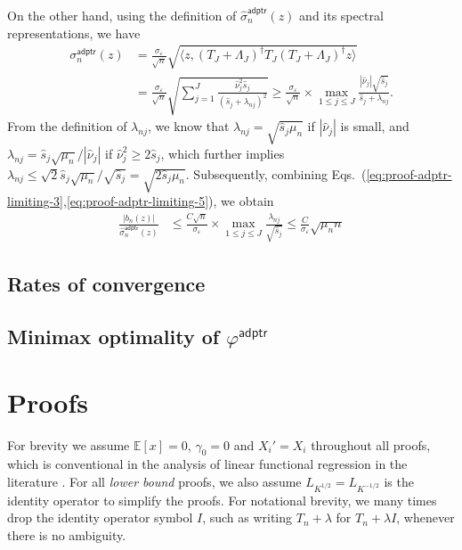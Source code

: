 \documentclass[11pt,a4paper]{article}
\renewcommand{\hat}{\widehat}
\theoremstyle{definition}
\theoremstyle{plain}
\theoremstyle{remark}
\newcommand{\adptr}{\mathsf{adptr}}
\begin{document}
On the other hand, using the definition of $\hat\sigma_n^\adptr(z)$ and its spectral representations, we have
\begin{align}
\sigma_n^\adptr(z) &= \frac{\sigma_\varepsilon}{\sqrt{n}}\sqrt{\langle z, (T_J+\Lambda_J)^\dagger T_J(T_J+\Lambda_J)^\dagger z\rangle} \nonumber\\
&= \frac{\sigma_\varepsilon}{\sqrt{n}}\sqrt{\sum_{j=1}^J\frac{\hat\nu_j^2\hat s_j}{(\hat s_j+\lambda_{nj})^2}}\geq \frac{\sigma_\varepsilon}{\sqrt{n}}\times \max_{1\leq j\leq J}\frac{|\hat\nu_j|\sqrt{\hat s_j}}{\hat s_j+\lambda_{nj}}.
\label{eq:proof-adptr-limiting-5}
\end{align}
From the definition of $\lambda_{nj}$, we know that $\lambda_{nj}=\sqrt{\hat s_j\mu_n}$ if $|\hat\nu_j|$ is small, and $\lambda_{nj}=\hat s_j\sqrt{\mu_n}/|\hat\nu_j|$
if $\hat\nu_j^2\geq 2\hat s_j$, which further implies $\lambda_{nj}\leq \sqrt{2}\hat s_j\sqrt{\mu_n}/\sqrt{\hat s_j} = \sqrt{2\hat s_j\mu_n}$. Subsequently, combining Eqs.~(\ref{eq:proof-adptr-limiting-3},\ref{eq:proof-adptr-limiting-5}),
we obtain
\begin{align}
\frac{|b_n(z)|}{\hat\sigma_n^\adptr(z)} &\leq \frac{C\sqrt{n}}{\sigma_\varepsilon}\times\max_{1\leq j\leq J}\frac{\lambda_{nj}}{\sqrt{\hat s_j}}\leq \frac{C}{\sigma_\varepsilon}\sqrt{\mu_n n}
\label{eq:proof-adptr-limiting-6}
\end{align}


\subsection{Rates of convergence}

 
\subsection{Minimax optimality of $\varphi^{\adptr}$}


\section{Proofs}

For brevity we assume $\mathbb E[x]=0$, $\gamma_0=0$ and $X_i'=X_i$ throughout all proofs, which is conventional in the analysis of linear functional regression in the literature \citep{cai2012minimax,yuan2010reproducing}.
For all \emph{lower bound} proofs, we also assume $L_{K^{1/2}}=L_{K^{-1/2}}$ is the identity operator to simplify the proofs.
For notational brevity, we many times drop the identity operator symbol $I$, such as writing $T_n+\lambda$ for $T_n+\lambda I$, whenever there is no ambiguity.
\end{document}
